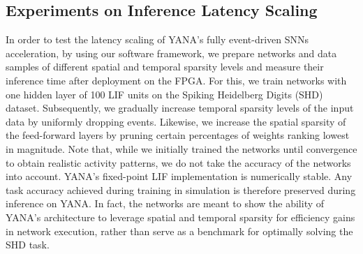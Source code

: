 \subsection{Experiments on Inference Latency Scaling}
\label{subsec:experiments}
In order to test the latency scaling of YANA's fully event-driven \acp{SNN} acceleration, by using our software framework, we prepare networks and data samples of different spatial and temporal sparsity levels and measure their inference time after deployment on the FPGA. 
For this, we train networks with one hidden layer of 100 \ac{LIF} units on the Spiking Heidelberg Digits (SHD) dataset.
Subsequently, we gradually increase temporal sparsity levels of the input data by uniformly dropping events. Likewise, we increase the spatial sparsity of the feed-forward layers by pruning certain percentages of weights ranking lowest in magnitude.
Note that, while we initially trained the networks until convergence to obtain realistic activity patterns, we do not take the accuracy of the networks into account. YANA's fixed-point \ac{LIF} implementation is numerically stable. Any task accuracy achieved during training in simulation is therefore preserved during inference on YANA.
In fact, the networks are meant to show the ability of YANA's architecture to leverage spatial and temporal sparsity for efficiency gains in network execution, rather than serve as a benchmark for optimally solving the SHD task.
